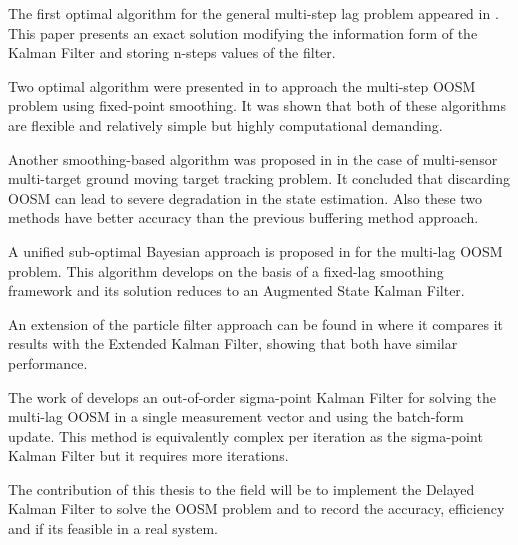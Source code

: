 \documentclass[ee,msthesis,proposal]{usuthesis}
\begin{document}
 The first optimal algorithm for the general multi-step lag problem appeared in \cite{Nettleton2001}. This paper presents an exact solution modifying the information form of the Kalman Filter and storing n-steps values of the filter.
 
 Two optimal algorithm were presented in \cite{Zhang2002} to approach the multi-step OOSM problem using fixed-point smoothing. It was shown that both of these algorithms are flexible and relatively simple but highly computational demanding.
 
 Another smoothing-based algorithm was proposed in \cite{Mallick2002} in the case of multi-sensor multi-target ground moving target tracking problem. It concluded that discarding OOSM can lead to severe degradation in the state estimation. Also these two methods have better accuracy than the previous buffering method approach. 
 
A unified sub-optimal Bayesian approach is proposed in \cite{Challa2002} for the multi-lag OOSM problem. This algorithm develops on the basis of a fixed-lag smoothing framework and its solution reduces to an Augmented State Kalman Filter.

An extension of the particle filter approach can be found in \cite{Orton2005} where it compares it results with the Extended Kalman Filter, showing that both have similar performance.

 The work of \cite{Plett2007} develops an out-of-order sigma-point Kalman Filter for solving the multi-lag OOSM in a single measurement vector and using the batch-form update. This method is equivalently complex per iteration as the sigma-point Kalman Filter but it requires more iterations.
 
The contribution of this thesis to the field will be to implement the Delayed Kalman Filter to solve the OOSM problem and to record the accuracy, efficiency and if its feasible in a real system.



\end{document}
